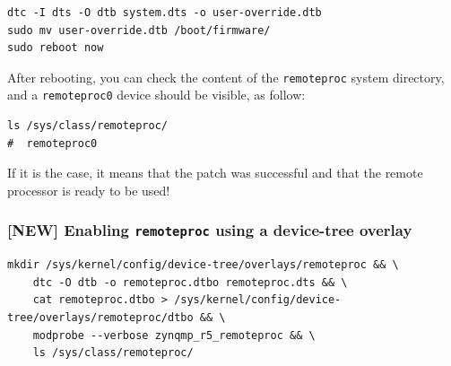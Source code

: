 \documentclass[10pt]{article}
\begin{document}
\begin{verbatim}
dtc -I dts -O dtb system.dts -o user-override.dtb
sudo mv user-override.dtb /boot/firmware/
sudo reboot now
\end{verbatim}

After rebooting, you can check the content of the \verb|remoteproc| system directory,
and a \texttt{remoteproc0} device should be visible, as follow:

\begin{verbatim}
ls /sys/class/remoteproc/
#  remoteproc0
\end{verbatim}

If it is the case, it means that the patch was successful and  that the remote processor is
ready to be used!
\pagebreak

\subsubsection{[NEW] Enabling \texttt{remoteproc} using a device-tree overlay}
\label{sec:orge3c017c}


\begin{verbatim}
mkdir /sys/kernel/config/device-tree/overlays/remoteproc && \
    dtc -O dtb -o remoteproc.dtbo remoteproc.dts && \
    cat remoteproc.dtbo > /sys/kernel/config/device-tree/overlays/remoteproc/dtbo && \
    modprobe --verbose zynqmp_r5_remoteproc && \
    ls /sys/class/remoteproc/
\end{verbatim}
\end{document}
